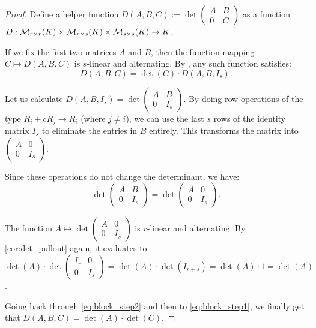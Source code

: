 \begin{proof}
  Define a helper function $D(A, B, C) := \det \left(\begin{smallmatrix} A & B \\ 0 & C \end{smallmatrix}\right)$ as a function $D : \mathcal{M}_{r \times r}(K) \times \mathcal{M}_{r \times s}(K) \times \mathcal{M}_{s \times s}(K) \to K$.

  If we fix the first two matrices $A$ and $B$, then the function mapping $C \mapsto D(A, B, C)$ is $s$-linear and alternating. By , any such function satisfies:
  \begin{equation} \label{eq:block_step1}
    D(A, B, C) = \det(C) \cdot D(A, B, I_s).
  \end{equation}

  Let us calculate $D(A, B, I_s) = \det \left ( \begin{smallmatrix} A & B \\ 0 & I_s \end{smallmatrix}\right)$. By doing row operations of the type $R_i + c R_j \to R_i$ (where $j \neq i$), we can use the last $s$ rows of the identity matrix $I_s$ to eliminate the entries in $B$ entirely. This transforms the matrix into $\left(\begin{smallmatrix} A & 0 \\ 0 & I_s \end{smallmatrix}\right)$.

  Since these operations do not change the determinant, we have:
  \begin{equation} \label{eq:block_step2}
    \det \begin{pmatrix} A & B \\ 0 & I_s \end{pmatrix} = \det \begin{pmatrix} A & 0 \\ 0 & I_s \end{pmatrix}.
  \end{equation}

  The function $A \mapsto \det \left(\begin{smallmatrix} A & 0 \\ 0 & I_s \end{smallmatrix}\right)$ is $r$-linear and alternating. By \cref{cor:det_pullout} again, it evaluates to $\det(A) \cdot \det \left(\begin{smallmatrix} I_r & 0 \\ 0 & I_s \end{smallmatrix}\right) = \det(A) \cdot \det(I_{r+s}) = \det(A) \cdot 1 = \det(A)$.

  Going back through \eqref{eq:block_step2} and then to \eqref{eq:block_step1}, we finally get that $D(A, B, C) = \det(A) \cdot \det(C)$.
\end{proof}

